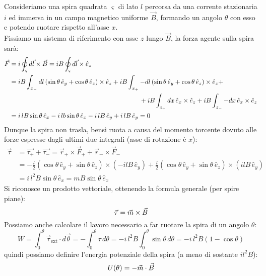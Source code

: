 Consideriamo una spira quadrata $ \varsigma $ di lato $ l $ percorsa da una corrente stazionaria $ i $ ed immersa in un campo magnetico uniforme $ \vec{B} $, formando un angolo $ \theta $ con esso e potendo ruotare rispetto all'asse $ x $. \\ 
%
Fissiamo un sistema di riferimento con asse $ z $ lungo $ \vec{B} $, la forza agente sulla spira sarà:
\begin{equation}
	\begin{split}
		\vec{F} &= i \oint_{\varsigma} d\vec{l}\times\vec{B} = i B \oint_{\varsigma} d\vec{l}\times\hat{e}_z \\ 
			&= iB\int_{x_-} dl \left(\sin\theta\,\hat{e}_y + \cos\theta\,\hat{e}_z\right) \times \hat{e}_z + iB\int_{x_+} -dl \left(\sin\theta\,\hat{e}_y + \cos\theta\,\hat{e}_z\right) \times \hat{e}_z + \\ 
			& \qquad\qquad\qquad\qquad\qquad\qquad\qquad\qquad\qquad\qquad + iB\int_{z_+} dx \, \hat{e}_x \times \hat{e}_z + iB\int_{z_-} -dx \,\hat{e}_x \times \hat{e}_z \\ 
			&= i\,lB\sin\theta\,\hat{e}_x - i\,lb\sin\theta\,\hat{e}_x - i\,lB\,\hat{e}_y + i\,lB\,\hat{e}_y = 0
	\end{split}
	\label{eq:}
\end{equation}
Dunque la spira non trasla, bensì ruota a causa del momento torcente dovuto alle forze espresse dagli ultimi due integrali (asse di rotazione è $ x $):
\begin{equation}
	\begin{split}
		\vec{\tau} &= \vec{\tau_+} + \vec{\tau_-} = \vec{r}_+ \times \vec{F}_+ + \vec{r}_- \times \vec{F}_- \\ 
			   &= -\frac{l}{2} \left(\cos\theta\,\hat{e}_y + \sin\theta\,\hat{e}_z\right) \times \left(-ilB\,\hat{e}_y\right) + \frac{l}{2} \left(\cos\theta\,\hat{e}_y + \sin\theta\,\hat{e}_z\right) \times \left(ilB\,\hat{e}_y\right) \\ 
			   &= i \, l^2 B \sin\theta \,\hat{e}_x = m B \sin\theta\,\hat{e}_x
	\end{split}
	\label{eq:calc-mom-sp}
\end{equation}
Si riconosce un prodotto vettoriale, ottenendo la formula generale (per spire piane):
\begin{equation}
	\vec{\tau} = \vec{m}\times\vec{B}
	\label{eq:mom-sp}
\end{equation}
Possiamo anche calcolare il lavoro necessario a far ruotare la spira di un angolo $ \theta $:
\begin{equation}
	W = \int_0^{\theta} \vec{\tau}_{\text{ext}} \cdot d\vec{\theta} = - \int_0^{\theta} \tau \, d\theta = - i \, l^2 B \int_0^{\theta} \sin\theta \,d\theta = - i \, l^2 B \left(1 - \cos\theta\right)
	\label{eq:}
\end{equation}
quindi possiamo definire l'energia potenziale della spira (a meno di sostante $ il^2 B $):
\begin{equation}
	U(\theta) = -\vec{m}\cdot\vec{B}
	\label{eq:pot-sp}
\end{equation}

